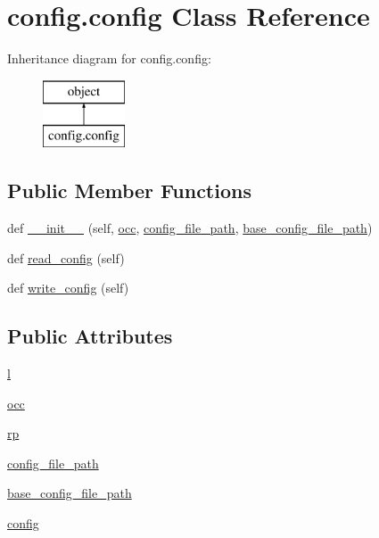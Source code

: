 \hypertarget{classconfig_1_1config}{}\section{config.\+config Class Reference}
\label{classconfig_1_1config}
Inheritance diagram for config.\+config\+:\begin{figure}[H]
\begin{center}
\leavevmode
\includegraphics[height=2.000000cm]{classconfig_1_1config}
\end{center}
\end{figure}
\subsection*{Public Member Functions}
\begin{DoxyCompactItemize}
\item 
def \hyperlink{classconfig_1_1config_a2f19893c6121bbacf28e3f4fafe93f08}{\+\_\+\+\_\+init\+\_\+\+\_\+} (self, \hyperlink{classconfig_1_1config_ac3bf336655093c3b3dcf8d24027e9b6e}{occ}, \hyperlink{classconfig_1_1config_ae2a8159c1071eb51bd9200540126ebc4}{config\+\_\+file\+\_\+path}, \hyperlink{classconfig_1_1config_a553062767fb374889c2f51f31be593d1}{base\+\_\+config\+\_\+file\+\_\+path})
\item 
def \hyperlink{classconfig_1_1config_a7dc5250998fe2899548ae676fbf6af51}{read\+\_\+config} (self)
\item 
def \hyperlink{classconfig_1_1config_a595ae0b2abc4883e8d703eb63570d0be}{write\+\_\+config} (self)
\end{DoxyCompactItemize}
\subsection*{Public Attributes}
\begin{DoxyCompactItemize}
\item 
\hyperlink{classconfig_1_1config_a98de02645a6c4a2cbcfce4cf22d548b8}{l}
\item 
\hyperlink{classconfig_1_1config_ac3bf336655093c3b3dcf8d24027e9b6e}{occ}
\item 
\hyperlink{classconfig_1_1config_aa4d251490aa3957ddf73d409800a89f9}{rp}
\item 
\hyperlink{classconfig_1_1config_ae2a8159c1071eb51bd9200540126ebc4}{config\+\_\+file\+\_\+path}
\item 
\hyperlink{classconfig_1_1config_a553062767fb374889c2f51f31be593d1}{base\+\_\+config\+\_\+file\+\_\+path}
\item 
\hyperlink{classconfig_1_1config_a5908fb27351049f2fb2bf3b12935b55b}{config}
\end{DoxyCompactItemize}


